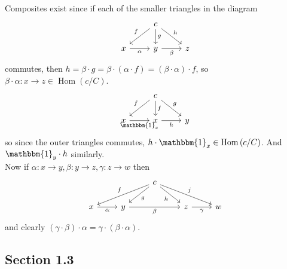 \documentclass[a4paper]{article}
\theoremstyle{plain}%
\theoremstyle{definition}
\theoremstyle{remark}
\DeclareMathOperator{\Hom}{Hom}
\begin{document}
Composites exist since if each of the smaller triangles in the diagram
\begin{equation*}
\begin{tikzcd}
    & c \ar[dl, "f"'] \ar[d, "g"] \ar[dr, "h"] &\\
    x \ar[r, "\alpha"'] & y \ar[r, "\beta"'] & z
\end{tikzcd}
\end{equation*}
commutes, then 
$h = \beta \cdot g = \beta \cdot  \left( \alpha \cdot f \right) 
= \left( \beta \cdot \alpha \right) \cdot f$, so
$\beta \cdot \alpha  \colon x \to z \in \Hom\left( c /C \right) $.\\
\begin{equation*}
\begin{tikzcd}
    & c \ar[dl, "f"'] \ar[d, "f"] \ar[dr, "g"] &\\
    x \ar[r, "\mathbbm{1}_x"'] & x \ar[r, "h"'] & y
\end{tikzcd}
\end{equation*}
so since the outer triangles commutes, $h \cdot \mathbbm{1}_x \in 
\Hom \left( c /C \right) $. And $\mathbbm{1}_y \cdot h$ similarly.\\
Now if  $\alpha  \colon x \to y, \beta  \colon y \to z, \gamma  \colon z \to w$ then
\begin{equation*}
\begin{tikzcd}
    & & c\ar[dll, "f"'] \ar[dl, "g"] \ar[dr, "h"'] \ar[drr, "j"]  & &\\
    x \ar[r, "\alpha"'] & y \ar[rr, "\beta"']& & z \ar[r, "\gamma"'] & w
\end{tikzcd}
\end{equation*}
and clearly $\left( \gamma \cdot  \beta \right) \cdot \alpha
= \gamma \cdot \left( \beta \cdot \alpha \right) $.\\
\linebreak







\subsection*{Section 1.3}
\end{document}
